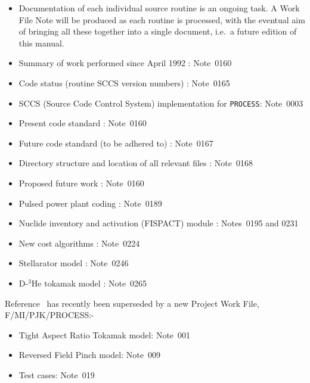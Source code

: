 \documentclass[11pt,a4paper]{report}
\newcommand{\process}{\mbox{\texttt{PROCESS}}}
\begin{document}
\begin{itemize}
\item
Documentation of each individual source routine is an ongoing task. A
Work File Note will be produced as each routine is processed, with the
eventual aim of bringing all these together into a single document,
i.e.\ a future edition of this manual.
\item
Summary of work performed since April 1992 : Note~0160
\item
Code status (routine SCCS version numbers) : Note~0165
\item
SCCS (Source Code Control System) implementation for \process: Note~0003
\item
Present code standard : Note~0160
\item
Future code standard (to be adhered to) : Note~0167
\item
Directory structure and location of all relevant files : Note~0168
\item
Proposed future work : Note~0160
\item
Pulsed power plant coding : Note~0189
\item
Nuclide inventory and activation (FISPACT) module : Notes~0195 and 0231
\item
New cost algorithms : Note~0224
\item
Stellarator model : Note~0246
\item
D-$^3$He tokamak model : Note~0265
\end{itemize}

Reference~\cite{PWF} has recently been superseded by a new Project Work File,
F/MI/PJK/PROCESS:-

\begin{itemize}
\item
Tight Aspect Ratio Tokamak model: Note~001

\item
Reversed Field Pinch model: Note~009

\item
Test cases: Note~019

\end{itemize}
\end{document}
